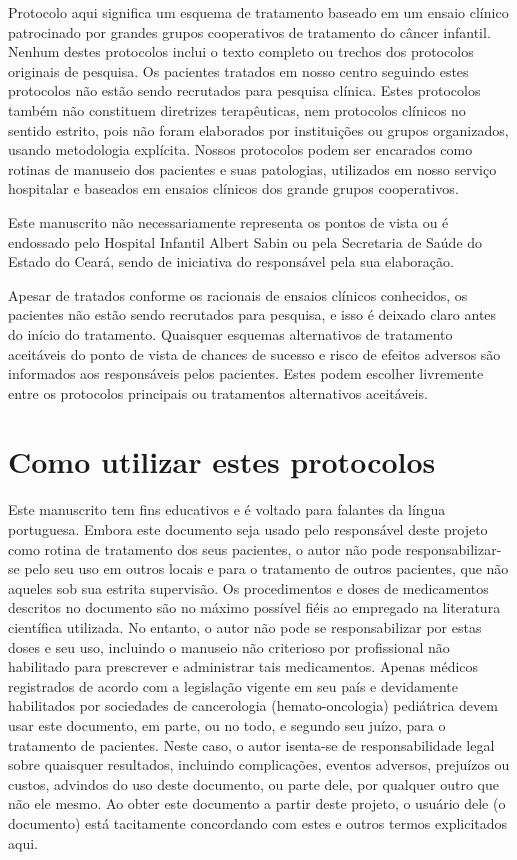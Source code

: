 \documentclass[11pt,a4paper,oldfontcommands]{memoir}
\begin{document}
Protocolo aqui significa um esquema de tratamento baseado em um ensaio clínico patrocinado por grandes grupos cooperativos de tratamento do câncer infantil. Nenhum destes protocolos inclui o texto completo ou trechos dos protocolos originais de pesquisa. Os pacientes tratados em nosso centro seguindo estes protocolos não estão sendo recrutados para pesquisa clínica. Estes protocolos também não constituem diretrizes terapêuticas, nem protocolos clínicos no sentido estrito, pois não foram elaborados por instituições ou grupos organizados, usando metodologia explícita. Nossos protocolos podem ser encarados como rotinas de manuseio dos pacientes e suas patologias, utilizados em nosso serviço hospitalar e baseados em ensaios clínicos dos grande grupos cooperativos.

Este manuscrito não necessariamente representa os pontos de vista ou é endossado pelo Hospital Infantil Albert Sabin ou pela Secretaria de Saúde do Estado do Ceará, sendo de iniciativa do responsável pela sua elaboração.

Apesar de tratados conforme os racionais de ensaios clínicos conhecidos, os pacientes não estão sendo recrutados para pesquisa, e isso é deixado claro antes do início do tratamento. Quaisquer esquemas alternativos de tratamento aceitáveis do ponto de vista de chances de sucesso e risco de efeitos adversos são informados aos responsáveis pelos pacientes. Estes podem escolher livremente entre os protocolos principais ou tratamentos alternativos aceitáveis.

\section{Como utilizar estes protocolos}

Este manuscrito tem fins educativos e é voltado para falantes da língua portuguesa.  Embora este documento seja usado pelo responsável deste projeto como rotina de tratamento dos seus pacientes, o autor não pode responsabilizar-se pelo seu uso em outros locais e para o tratamento de outros pacientes, que não aqueles sob sua estrita supervisão. Os procedimentos e doses de medicamentos descritos no documento são no máximo possível fiéis ao empregado na literatura científica utilizada. No entanto, o autor não pode se responsabilizar por estas doses e seu uso, incluindo o manuseio não criterioso por profissional não habilitado para prescrever e administrar tais medicamentos. Apenas médicos registrados de acordo com a legislação vigente em seu país e devidamente habilitados por sociedades de cancerologia (hemato-oncologia) pediátrica devem usar este documento, em parte, ou no todo, e segundo seu juízo, para o tratamento de pacientes. Neste caso, o autor isenta-se de responsabilidade legal sobre quaisquer resultados, incluindo complicações, eventos adversos, prejuízos ou custos, advindos do uso deste documento, ou parte dele, por qualquer outro que não ele mesmo. Ao obter este documento a partir deste projeto, o usuário dele (o documento) está tacitamente concordando com estes e outros termos explicitados aqui.
\end{document}
